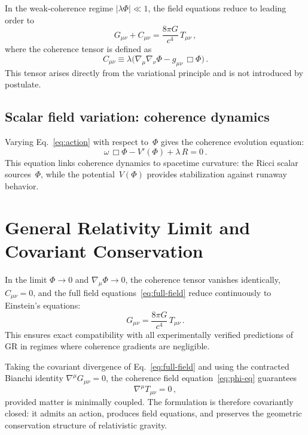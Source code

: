 \documentclass[showpacs,preprintnumbers,amsmath,amssymb,prd,longbibliography]{revtex4-2}
\begin{document}
In the weak-coherence regime $|\lambda\Phi| \ll 1$,
the field equations reduce to leading order to
\begin{equation}
G_{\mu\nu} + C_{\mu\nu} = \frac{8\pi G}{c^4}\,T_{\mu\nu}\,,
\label{eq:reduced-field}
\end{equation}
where the coherence tensor is defined as
\begin{equation}
C_{\mu\nu} \equiv \lambda\big(\nabla_\mu\nabla_\nu\Phi
- g_{\mu\nu}\,\Box\Phi\big)\,.
\label{eq:coherence-tensor}
\end{equation}
This tensor arises directly from the variational principle
and is not introduced by postulate.

\subsection{Scalar field variation: coherence dynamics}

Varying Eq.~\eqref{eq:action} with respect to~$\Phi$ gives the
coherence evolution equation:
\begin{equation}
\omega\,\Box\Phi - V'(\Phi) + \lambda\,R = 0\,.
\label{eq:phi-eq}
\end{equation}
This equation links coherence dynamics to spacetime curvature:
the Ricci scalar sources~$\Phi$, while the potential~$V(\Phi)$
provides stabilization against runaway behavior.

\section{General Relativity Limit and Covariant Conservation}
\label{sec:gr-limit}

In the limit $\Phi \to 0$ and $\nabla_\mu\Phi \to 0$,
the coherence tensor vanishes identically, $C_{\mu\nu} = 0$,
and the full field equations~\eqref{eq:full-field} reduce
continuously to Einstein's equations:
\begin{equation}
G_{\mu\nu} = \frac{8\pi G}{c^4}\,T_{\mu\nu}\,.
\end{equation}
This ensures exact compatibility with all experimentally
verified predictions of GR in regimes where coherence
gradients are negligible.

Taking the covariant divergence of Eq.~\eqref{eq:full-field}
and using the contracted Bianchi identity
$\nabla^\mu G_{\mu\nu} = 0$, the coherence field
equation~\eqref{eq:phi-eq} guarantees
\begin{equation}
\nabla^\mu T_{\mu\nu} = 0\,,
\end{equation}
provided matter is minimally coupled.
The formulation is therefore covariantly closed:
it admits an action, produces field equations, and preserves
the geometric conservation structure of relativistic gravity.
\end{document}
